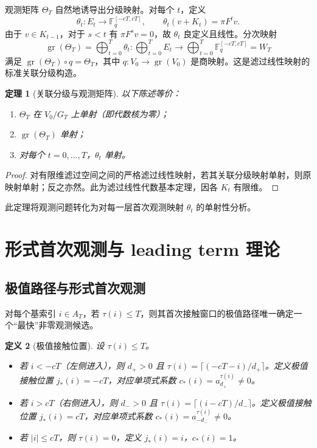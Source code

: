 \documentclass[11pt,a4paper]{ctexart}
\newtheorem{theorem}{定理}[section]
\newtheorem{definition}[theorem]{定义}
\newcommand{\F}{\mathbb{F}}
\DeclareMathOperator{\gr}{gr}
\begin{document}
观测矩阵 \(\Theta_T\) 自然地诱导出分级映射。对每个 \(t\)，定义
\[
\theta_t : E_t \longrightarrow \F_q^{[-cT,cT]},\qquad
\theta_t(v + K_t) = \pi F^t v.
\]
由于 \(v\in K_{t-1}\)，对于 \(s<t\) 有 \(\pi F^s v = 0\)，故 \(\theta_t\) 良定义且线性。分次映射
\[
\gr(\Theta_T) = \bigoplus_{t=0}^T \theta_t : \bigoplus_{t=0}^T E_t \longrightarrow \bigoplus_{t=0}^T \F_q^{[-cT,cT]} = W_T
\]
满足 \(\gr(\Theta_T)\circ q = \Theta_T\)，其中 \(q: V_0 \to \gr(V_0)\) 是商映射。这是滤过线性映射的标准关联分级构造。

\begin{theorem}[关联分级与观测矩阵]\label{thm:associated_graded}
以下陈述等价：
\begin{enumerate}[label=(\roman*)]
    \item \(\Theta_T\) 在 \(V_0/G_T\) 上单射（即代数核为零）；
    \item \(\gr(\Theta_T)\) 单射；
    \item 对每个 \(t=0,\dots,T\)，\(\theta_t\) 单射。
\end{enumerate}
\end{theorem}
\begin{proof}
对有限维滤过空间之间的严格滤过线性映射，若其关联分级映射单射，则原映射单射；反之亦然。此为滤过线性代数基本定理，因各 \(K_t\) 有限维。
\end{proof}

此定理将观测问题转化为对每一层首次观测映射 \(\theta_t\) 的单射性分析。

\section{形式首次观测与 leading term 理论}

\subsection{极值路径与形式首次观测}
对每个基索引 \(i\in A_T\)，若 \(\tau(i)\le T\)，则其首次接触窗口的极值路径唯一确定一个“最快”非零观测候选。

\begin{definition}[极值接触位置]
设 \(\tau(i)\le T\)。
\begin{itemize}
    \item 若 \(i<-cT\)（左侧进入），则 \(d_+>0\) 且 \(\tau(i)=\lceil(-cT-i)/d_+\rceil\)。定义极值接触位置 \(j_*(i) = -cT\)，对应单项式系数 \(c_*(i) = a_{d_+}^{\tau(i)} \neq 0\)。
    \item 若 \(i>cT\)（右侧进入），则 \(d_->0\) 且 \(\tau(i)=\lceil(i-cT)/d_-\rceil\)。定义极值接触位置 \(j_*(i) = cT\)，对应单项式系数 \(c_*(i) = a_{-d_-}^{\tau(i)} \neq 0\)。
    \item 若 \(|i|\le cT\)，则 \(\tau(i)=0\)，定义 \(j_*(i)=i\)，\(c_*(i)=1\)。
\end{itemize}
\end{definition}
\end{document}
